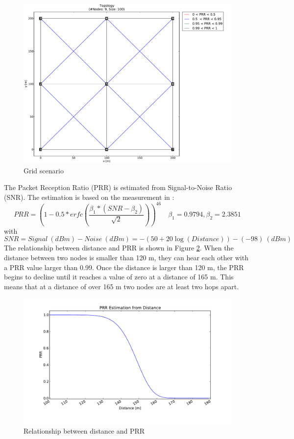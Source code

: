 \begin{figure}[htpb]	
  	\centering
    \leavevmode
      \includegraphics[scale=0.35]{Pics/results/topo9_dist100_grid.pdf}
    \caption{Grid scenario}
    \label{fig:scenario_grid}
\end{figure}

The Packet Reception Ratio (PRR) is estimated from Signal-to-Noise Ratio (SNR). The estimation is based on the measurement in \cite{RL08}:
\[
PRR = (1-0.5*erfc(\frac{\beta_1*(SNR-\beta_2)}{\sqrt{2}}))^{46}
\quad{\beta_1} = 0.9794, {\beta_2} = 2.3851
\] 
with 
\[
SNR = Signal\:(dBm)- Noise\:(dBm) = -(50 + 20 {\log}(Distance)) - (-98)\:(dBm)
\] 
The relationship between distance and PRR is shown in Figure \ref{fig:prr}. When the distance between two nodes is smaller than 120 m, they can hear each other with a PRR value larger than 0.99. Once the distance is larger than 120 m, the PRR begins to decline until it reaches a value of zero at a distance of 165 m. This means that at a distance of over 165 m two nodes are at least two hops apart.

\begin{figure}[htbp]
  \begin{center}
    \leavevmode
      \includegraphics[scale=0.45]{Pics/prr.pdf}
   \caption{Relationship between distance and PRR}
    \label{fig:prr}
  \end{center}
\end{figure}

